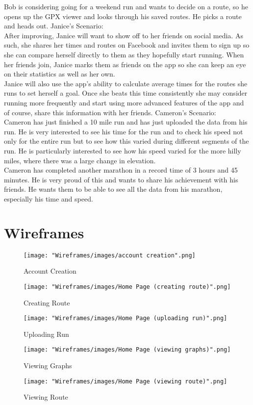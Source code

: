 \documentclass{article}
\begin{document}
Bob is considering going for a weekend run and wants to decide on a route, so he opens up the GPX viewer and looks through his saved routes. He picks a route and heads out.
\vspace{5mm}
Janice's Scenario:\\
After improving, Janice will want to show off to her friends on social media. As such, she shares her times and routes on Facebook and invites them to sign up so she can compare herself directly to them as they hopefully start running. When her friends join, Janice marks them as friends on the app so she can keep an eye on their statistics as well as her own.\\
Janice will also use the app’s ability to calculate average times for the routes she runs to set herself a goal. Once she beats this time consistently she may consider running more frequently and start using more advanced features of the app and of course, share this information with her friends.
\vspace{5mm}
Cameron's Scenario:\\
Cameron has just finished a 10 mile run and has just uploaded the data from his run. He is very interested to see his time for the run and to check his speed not only for the entire run but to see how this varied during different segments of the run. He is particularly interested to see how his speed varied for the more hilly miles, where there was a large change in elevation.\\
Cameron has completed another marathon in a record time of 3 hours and 45 minutes. He is very proud of this and wants to share his achievement with his friends. He wants them to be able to see all the data from his marathon, especially his time and speed.

\section{Wireframes}
\label{sec:wire}

\begin{figure}
\texttt{[image: "Wireframes/images/account creation".png]}
\caption{Account Creation}
\end{figure}

\begin{figure}
\texttt{[image: "Wireframes/images/Home Page (creating route)".png]}
\caption{Creating Route}
\end{figure}

\begin{figure}
\texttt{[image: "Wireframes/images/Home Page (uploading run)".png]}
\caption{Uploading Run}
\end{figure}

\begin{figure}
\texttt{[image: "Wireframes/images/Home Page (viewing graphs)".png]}
\caption{Viewing Graphs}
\end{figure}

\begin{figure}
\texttt{[image: "Wireframes/images/Home Page (viewing route)".png]}
\caption{Viewing Route}
\end{figure}
\end{document}

